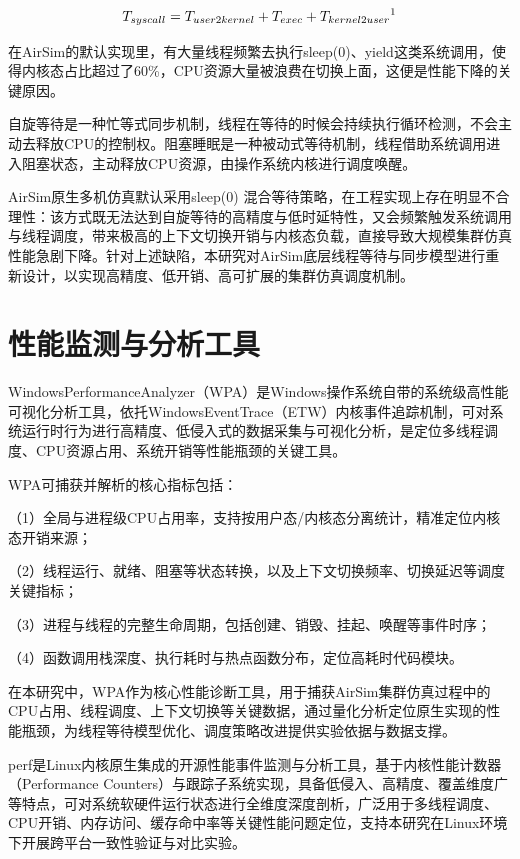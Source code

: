 \begin{equation}
	T_{syscall}=T_{user2kernel}+T_{exec}+T_{kernel2user}\text{\footnotemark[1]}
	\label{eq:syscall-time}
\end{equation}


在AirSim的默认实现里，有大量线程频繁去执行sleep(0)、yield这类系统调用，使得内核态占比超过了60\%，CPU资源大量被浪费在切换上面，这便是性能下降的关键原因。

自旋等待是一种忙等式同步机制，线程在等待的时候会持续执行循环检测，不会主动去释放CPU的控制权。阻塞睡眠是一种被动式等待机制，线程借助系统调用进入阻塞状态，主动释放CPU资源，由操作系统内核进行调度唤醒。

AirSim原生多机仿真默认采用sleep(0)
混合等待策略，在工程实现上存在明显不合理性：该方式既无法达到自旋等待的高精度与低时延特性，又会频繁触发系统调用与线程调度，带来极高的上下文切换开销与内核态负载，直接导致大规模集群仿真性能急剧下降。针对上述缺陷，本研究对AirSim底层线程等待与同步模型进行重新设计，以实现高精度、低开销、高可扩展的集群仿真调度机制。

\section{性能监测与分析工具}

WindowsPerformanceAnalyzer（WPA）是Windows操作系统自带的系统级高性能可视化分析工具，依托WindowsEventTrace（ETW）内核事件追踪机制，可对系统运行时行为进行高精度、低侵入式的数据采集与可视化分析，是定位多线程调度、CPU资源占用、系统开销等性能瓶颈的关键工具。

WPA可捕获并解析的核心指标包括：

（1）全局与进程级CPU占用率，支持按用户态/内核态分离统计，精准定位内核态开销来源；

（2）线程运行、就绪、阻塞等状态转换，以及上下文切换频率、切换延迟等调度关键指标；

（3）进程与线程的完整生命周期，包括创建、销毁、挂起、唤醒等事件时序；

（4）函数调用栈深度、执行耗时与热点函数分布，定位高耗时代码模块。

在本研究中，WPA作为核心性能诊断工具，用于捕获AirSim集群仿真过程中的CPU占用、线程调度、上下文切换等关键数据，通过量化分析定位原生实现的性能瓶颈，为线程等待模型优化、调度策略改进提供实验依据与数据支撑。

perf是Linux内核原生集成的开源性能事件监测与分析工具，基于内核性能计数器（Performance
Counters）与跟踪子系统实现，具备低侵入、高精度、覆盖维度广等特点，可对系统软硬件运行状态进行全维度深度剖析，广泛用于多线程调度、CPU开销、内存访问、缓存命中率等关键性能问题定位，支持本研究在Linux环境下开展跨平台一致性验证与对比实验。

